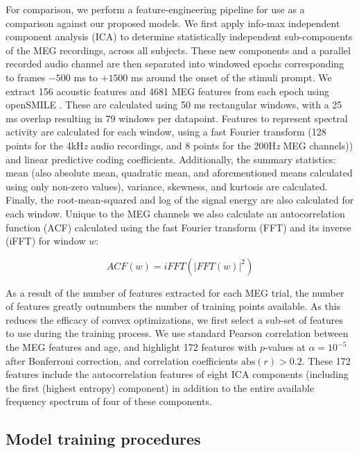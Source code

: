 \documentclass[fleqn,10pt]{wlscirep}
\begin{document}
For comparison, we perform a feature-engineering pipeline for use as a comparison against our proposed models. We first apply info-max independent component analysis (ICA) \cite{Bell1995} to determine statistically independent sub-components of the MEG recordings, across all subjects. These new components and a parallel recorded audio channel are then separated into windowed epochs corresponding to frames $-500$ ms to $+1500$ ms around the onset of the stimuli prompt. We extract 156 acoustic features and 4681 MEG features from each epoch using openSMILE \cite{Eyben13-RDI}. These are calculated using 50 ms rectangular windows, with a 25 ms overlap resulting in 79 windows per datapoint. Features to represent spectral activity are calculated for each window, using a fast Fourier transform (128 points for the 4kH{\em z} audio recordings, and 8 points for the 200H{\em z} MEG channels)) and linear predictive coding coefficients. Additionally, the summary statistics: mean (also absolute mean, quadratic mean, and aforementioned means calculated using only non-zero values), variance, skewness, and kurtosis are calculated. Finally, the root-mean-squared and log of the signal energy are also calculated for each window. Unique to the MEG channels we also calculate an autocorrelation function (ACF) calculated using the fast Fourier transform (FFT) and its inverse (iFFT) for window $w$:

\begin{equation}
  ACF(w) = iFFT(|FFT(w)|^2)
  \label{eq1}
\end{equation}

As a result of the number of features extracted for each MEG trial, the number of features greatly outnumbers the number of training points available. As this reduces the efficacy of convex optimizations, we first select a sub-set of features to use during the training process. We use standard Pearson correlation between the MEG features and age, and highlight 172 features with $p$-values at $\alpha = 10^{-5}$ after Bonferroni correction, and correlation coefficients $\text{abs}(r) > 0.2$. These 172 features include the autocorrelation features of eight ICA components (including the first (highest entropy) component) in addition to the entire available frequency spectrum of four of these components.

\subsection*{Model training procedures} \label{sec:train_proc}
\end{document}
